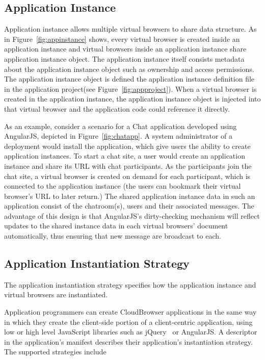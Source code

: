 \subsection{Application Instance}
\label{sec:appins}
\appinstancefig{}


Application instance allows multiple virtual browsers to share data structure.
As in Figure~\ref{fig:appinstance} shows, 
every virtual browser is created inside an application instance
and virtual browsers inside an application instance share application instance object.
The application instance itself
consists metadata about the application instance object
 such as ownership and access permissions.
The application instance object is defined
the application instance definition file 
in the application project(see Figure~\ref{fig:appproject}).
When a virtual browser is created in the application instance,
the application instance object is injected into that virtual browser
and the application code could reference it directly.

\chatappfig{}

As an example, consider a scenario for a Chat application developed using AngularJS,
depicted in Figure~\ref{fig:chatapp}.
A system administrator of a \cb deployment would install the application, which give users the
ability to create application instances. To start a chat site, a user would create
an application instance and share its URL with chat participants.  As the participants join
the chat site, a virtual browser is created on demand for each participant, which is connected
to the application instance (the users can bookmark their virtual browser's URL to later return.)
The shared application instance data in such an application
consist of the chatroom(s), users and their associated messages.  The advantage of this design
is that AngularJS's dirty-checking mechanism will reflect updates to the shared instance data
in each virtual browsers' document automatically, thus ensuring that new message are broadcast
to each.



\subsection{Application Instantiation Strategy}
\label{sec:appinstantiation}

The application instantiation strategy specifies
how the application instance and virtual browsers are instantiated.

Application programmers can create CloudBrowser applications in the same way in which
they create the client-side portion of a client-centric application, using low or high level
JavaScript libraries such as jQuery~\cite{jquery} or AngularJS.  
A descriptor in the application's manifest describes 
their application's instantiation strategy.
The supported strategies include

